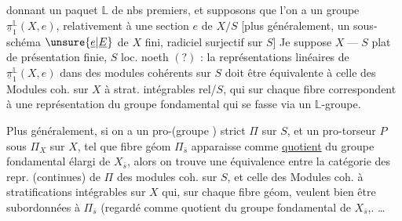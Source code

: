 donnant un paquet $\mathbb L$ de nbs premiers, et supposons que l'on a un groupe  $\underline{\pi}_1^{\mathbb L}(X,e)$, relativement à une section $e$ de $X/S$ [plus généralement, un sous-schéma $\unsure{\underline e|\underline E}$ de $X$ fini,  radiciel surjectif sur $S$] Je suppose $X\mathrel{\text{---}}S$ plat de présentation finie,  $S$ loc. noeth $(?)$ : la  représentations linéaires de $\underline{\pi}_1^{\mathbb L}(X,e)$ dans des modules cohérents sur $S$ doit être équivalente à celle des  Modules coh. sur $X$ à strat. intégrables rel/$S$, qui sur chaque fibre  correspondent à une représentation du groupe fondamental qui  se fasse via un $\mathbb L$-groupe.

Plus généralement, si on a un  pro-(groupe  )  strict $\Pi$ sur $S$, et un pro-torseur $P$ sous $\Pi_X$ sur $X$, tel que  fibre géom  $\Pi_{\bar s}$ apparaisse comme \uline{quotient} du groupe fondamental élargi de $X_{\bar s}$, alors on  trouve une  équivalence entre la catégorie des repr. (continues) de $\Pi$  des modules coh. sur $S$, et celle des Modules coh. à stratifications intégrables sur $X$ qui, sur chaque fibre géom, veulent bien être subordonnées à $\Pi_{\bar s}$ (regardé comme quotient du groupe fondamental de $X_{\bar s}$,. \ldots
